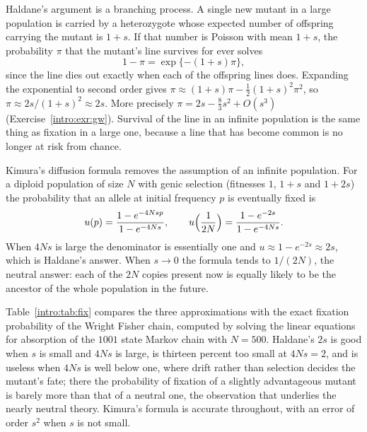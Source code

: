\begin{example}\label{intro:ex:haldane}
Haldane's argument is a branching process. A single new mutant in a large population is carried
by a heterozygote whose expected number of offspring carrying the mutant is $1+s$. If that number
is Poisson with mean $1+s$, the probability $\pi$ that the mutant's line survives for ever solves
\begin{equation}\label{intro:eq:gw}
1-\pi=\exp\{-(1+s)\pi\},
\end{equation}
since the line dies out exactly when each of the offspring lines does. Expanding the exponential to
second order gives $\pi\approx(1+s)\pi-\tfrac12(1+s)^2\pi^2$, so $\pi\approx2s/(1+s)^2\approx2s$.
More precisely $\pi=2s-\tfrac83s^2+O(s^3)$ (Exercise~\ref{intro:exr:gw}). Survival of the line
in an infinite population is the same thing as fixation in a large one, because a line that has
become common is no longer at risk from chance.

Kimura's diffusion formula \citep{intro:kimura1962} removes the assumption of an infinite
population. For a diploid population of size $N$ with genic selection (fitnesses $1$, $1+s$ and
$1+2s$) the probability that an allele at initial frequency $p$ is eventually fixed is
\begin{equation}\label{intro:eq:kimura}
u(p)=\frac{1-e^{-4Nsp}}{1-e^{-4Ns}},\qquad u\Bigl(\frac1{2N}\Bigr)=\frac{1-e^{-2s}}{1-e^{-4Ns}} .
\end{equation}
When $4Ns$ is large the denominator is essentially one and $u\approx1-e^{-2s}\approx2s$, which is
Haldane's answer. When $s\to0$ the formula tends to $1/(2N)$, the neutral answer: each of the $2N$
copies present now is equally likely to be the ancestor of the whole population in the future.

Table~\ref{intro:tab:fix} compares the three approximations with the exact fixation probability of
the Wright Fisher chain, computed by solving the linear equations for absorption of the
$1001$ state Markov chain with $N=500$. Haldane's $2s$ is good when $s$ is small and $4Ns$ is large, is
thirteen percent too small at $4Ns=2$, and is useless when $4Ns$ is well below one, where drift
rather than selection decides the mutant's fate; there the
probability of fixation of a slightly advantageous mutant is barely more than that of a neutral
one, the observation that underlies the nearly neutral theory. Kimura's formula is accurate
throughout, with an error of order $s^2$ when $s$ is not small.
\end{example}

